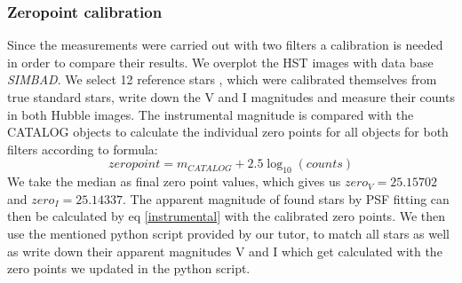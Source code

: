 \subsubsection{Zeropoint calibration}
Since the measurements were carried out with two filters a calibration is needed in order to compare their results. We overplot the HST images with data base \textit{SIMBAD}. We select 12 reference stars , which were calibrated themselves from true standard stars, write down the V and I magnitudes and measure their counts in both Hubble images. 
\vspace{2mm}
The instrumental magnitude is compared with the CATALOG objects to calculate the individual zero points for all objects for both filters according to formula:
\begin{equation}
\label{calibration}
	zeropoint = m_{CATALOG} + 2.5 \log_{10}{(counts)}
\end{equation}
We take the median as final zero point values, which gives us $zero_V = 25.15702$  and $zero_I = 25.14337$. The apparent magnitude of found stars by PSF fitting can then be calculated by eq \ref{instrumental} with the calibrated zero points. We then use the mentioned python script provided by our tutor, to match all stars as well as write down their apparent magnitudes V and I which get calculated with the zero points we updated in the python script. 
\vspace{3mm}\\
